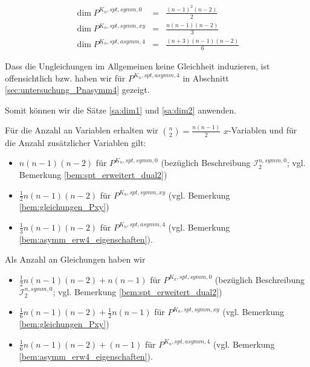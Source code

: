 \documentclass[10p,a4paper,BCOR = 12mm, DIV=15]{scrbook}
\begin{document}
\begin{Sa}
\label{sa:dimension_formulierungen}
\begin{eqnarray*}
\dim P^{K_n, spt, symm, 0} & = & \frac{\left(n-1\right)^2 \left(n-2\right)}{2} \\
\dim P^{K_n, spt, symm, xy} & = & \frac{n \left(n-1\right)\left(n-2\right)}{3} \\
\dim P^{K_n, spt, asymm, 4} & = & \frac{\left(n+3\right)\left(n-1\right)\left(n-2\right)}{6}
\end{eqnarray*}
\end{Sa}
\begin{bew}
Dass die Ungleichungen im Allgemeinen keine Gleichheit induzieren, ist offensichtlich bzw. haben wir für $P^{K_n, spt, asymm, 4}$ in Abschnitt \ref{sec:untersuchung_Pnasymm4} gezeigt.

Somit können wir die Sätze \ref{sa:dim1} und \ref{sa:dim2} anwenden.

Für die Anzahl an Variablen erhalten wir ${n \choose 2} = \frac{n \left(n-1\right)}{2}$ $x$-Variablen und für die Anzahl zusätzlicher Variablen gilt:
\begin{itemize}
\item $n \left(n-1\right) \left(n-2\right)$ für $P^{K_n, spt, symm, 0}$ (bezüglich Beschreibung $\mathcal{I}^{n, symm, 0}_2$; vgl. Bemerkung \ref{bem:spt_erweitert_dual2})
\item $\frac{1}{2} n \left(n-1\right) \left(n-2\right)$ für $P^{K_n, spt, symm, xy}$ (vgl. Bemerkung \ref{bem:gleichungen_Pxy})
\item $\frac{1}{3} n \left(n-1\right) \left(n-2\right)$ für $P^{K_n, spt, asymm, 4}$ (vgl. Bemerkung \ref{bem:asymm_erw4_eigenschaften}).
\end{itemize}

Als Anzahl an Gleichungen haben wir
\begin{itemize}
\item $\frac{1}{2} n \left(n-1\right) \left(n-2\right) + n \left(n-1\right)$ für $P^{K_n, spt, symm, 0}$ (bezüglich Beschreibung $\mathcal{I}^{n, symm, 0}_2$; vgl. Bemerkung \ref{bem:spt_erweitert_dual2})
\item $\frac{1}{6} n \left(n-1\right) \left(n-2\right) + \frac{1}{2} n \left(n-1\right)$ für $P^{K_n, spt, symm, xy}$ (vgl. Bemerkung \ref{bem:gleichungen_Pxy})
\item $\frac{1}{6} n \left(n-1\right) \left(n-2\right) + \left(n-1\right)$ für $P^{K_n, spt, asymm, 4}$ (vgl. Bemerkung \ref{bem:asymm_erw4_eigenschaften}).
\end{itemize}


\end{bew}
\end{document}
